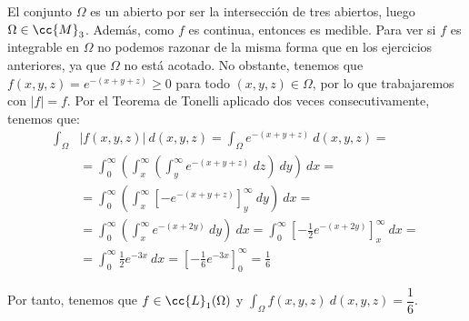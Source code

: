 \begin{ejercicio}
\begin{enumerate}
        El conjunto $\Omega$ es un abierto por ser la intersección de tres abiertos, luego $\Omega\in \cc{M}_3$. Además, como $f$ es continua, entonces
        es medible. Para ver si $f$ es integrable en $\Omega$ no podemos razonar de la misma forma que
        en los ejercicios anteriores, ya que $\Omega$ no está acotado. No obstante, tenemos que
        $f(x,y,z)=e^{-(x+y+z)}\geq 0$ para todo $(x,y,z)\in \Omega$, por lo que trabajaremos con $|f|=f$.
        Por el Teorema de Tonelli aplicado dos veces consecutivamente, tenemos que:
        \begin{align*}
            \int_{\Omega} &|f(x, y, z)|~d(x, y, z)
            = \int_{\Omega} e^{-(x+y+z)}~d(x, y, z)
            =\\&= \int_{0}^{\infty} \left( \int_{x}^{\infty} \left( \int_{y}^{\infty} e^{-(x+y+z)}~dz \right)~dy \right)~dx
            =\\&= \int_{0}^{\infty} \left( \int_{x}^{\infty} \left[ -e^{-(x+y+z)} \right]_{y}^{\infty}~dy \right)~dx
            =\\&= \int_{0}^{\infty} \left( \int_{x}^{\infty} e^{-(x+2y)}~dy \right)~dx
            = \int_{0}^{\infty} \left[ -\frac{1}{2}e^{-(x+2y)} \right]_{x}^{\infty}~dx
            =\\&= \int_{0}^{\infty} \frac{1}{2}e^{-3x} ~dx
            = \left[ -\frac{1}{6}e^{-3x} \right]_{0}^{\infty}
            = \frac{1}{6}
        \end{align*}

        Por tanto, tenemos que $f\in \cc{L}_1(\Omega)$ y $\displaystyle \int_{\Omega} f(x, y, z)~d(x, y, z) = \dfrac{1}{6}$.
    \end{enumerate}

\end{ejercicio}

